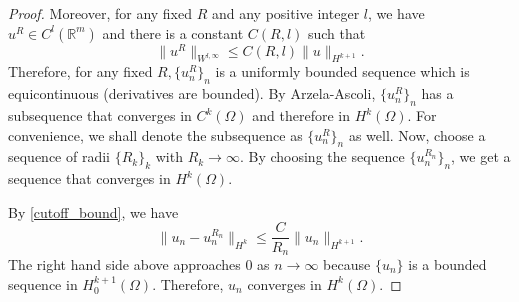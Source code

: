 \documentclass[a4paper]{article}
\newcommand{\R}{\mathbb{R}}
\begin{document}
\begin{enumerate}
\begin{proof}
      Moreover, for any fixed $R$ and any positive integer $l$, we have $u^R \in C^l(\R^m)$ and there is a constant $C(R,l)$ such that
      \[ \|u^R\|_{W^{l,\infty}} \leq C(R,l) \|u\|_{H^{k+1}} .\]
      Therefore, for any fixed $R, \{u^R_n\}_n$ is a uniformly bounded sequence which is equicontinuous (derivatives are bounded).
      By Arzela-Ascoli, $\{u^R_n\}_n$ has a subsequence that converges in $C^k(\Omega)$ and therefore in $H^k(\Omega)$. For convenience, we shall
      denote the subsequence as $\{u_n^R\}_n$ as well.
      Now, choose a sequence of radii $\{R_k\}_k$ with $R_k \to \infty$.
      By choosing the sequence $\{u_n^{R_n} \}_n$, we get a sequence that converges in $H^k(\Omega)$.

      By \eqref{cutoff_bound}, we have
      \[ \| u_n - u_n^{R_n} \|_{H^k} \leq \frac{C}{R_n} \|u_n\|_{H^{k+1}} .\]
      The right hand side above approaches 0 as $n \to \infty$ because $\{u_n\}$ is a bounded sequence in $H^{k+1}_0(\Omega)$. Therefore, $u_n$
      converges in $H^k(\Omega)$.
    \end{proof}

\end{enumerate}
\end{document}
